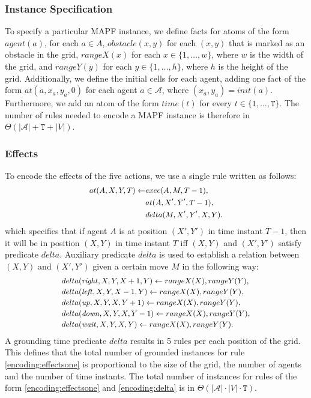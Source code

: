 \subsubsection{Instance Specification}
To specify a particular MAPF instance, we define facts for atoms of the form $agent(a)$, for each $a\in A$, $obstacle(x,y)$ for each $(x,y)$ that is marked as an obstacle in the grid, $rangeX(x)$ for each $x\in\{1,\ldots,w\}$, where $w$ is the width of the grid, and $rangeY(y)$ for each $y\in\{1,\ldots,h\}$, where $h$ is the height of the grid. Additionally, we define the initial cells for each agent, adding one fact of the form $at(a,x_a,y_a,0)$ for each agent $a\in \mathcal{A}$, where $(x_a,y_a)=init(a)$. Furthermore, we add an atom of the form $time(t)$ for every $t\in\{1,\dots,\mathtt{T}\}$. The number of rules needed to encode a MAPF instance is therefore in $\Theta(|\mathcal{A}| + \mathtt{T} + |V|)$.

\subsubsection{Effects}
To encode the effects of the five actions, we use a single rule written as follows:
\begin{equation}\small\label{encoding:effectsone}
\begin{split}
at(A,X,Y,T) \leftarrow &exec(A,M,T-1),\\&at(A,X',Y',T-1), \\&delta(M,X',Y',X,Y).
\end{split}
\end{equation}
which specifies that if agent $A$ is at position $(X',Y')$ in time instant $T-1$, then it will be in position $(X,Y)$ in time instant $T$ iff $(X,Y)$ and $(X',Y')$ satisfy predicate $delta$. Auxiliary predicate $delta$ is used to establish a relation between $(X,Y)$ and $(X',Y')$ given a certain move $M$ in the following way:
\begin{equation}\small\label{encoding:delta}
\begin{split}
&delta(\Right,X,Y,X+1,Y) \leftarrow rangeX(X), rangeY(Y),\\
&delta(\Left,X,Y,X-1,Y) \leftarrow rangeX(X), rangeY(Y),\\
&delta(\Up,X,Y,X,Y+1) \leftarrow rangeX(X), rangeY(Y),\\
&delta(\Down,X,Y,X,Y-1) \leftarrow rangeX(X), rangeY(Y),\\
&delta(\Wait,X,Y,X,Y) \leftarrow rangeX(X),rangeY(Y).
\end{split}
\end{equation}
A grounding time predicate $delta$ results in 5 rules per each position of the grid. This defines that the total number of grounded instances for rule \eqref{encoding:effectsone} is proportional to the size of the grid, the number of agents and the number of time instants. The total number of instances for rules of the form \eqref{encoding:effectsone} and \eqref{encoding:delta} is in $\Theta(|\mathcal{A}|\cdot |V| \cdot \mathtt{T})$.

